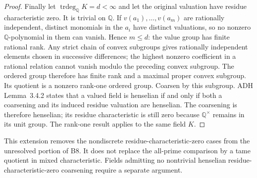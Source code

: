 \begin{proof}
Finally let $\operatorname{trdeg}_{\mathbb Q}K=d<\infty$
and let the original valuation have residue characteristic zero.
It is trivial on $\mathbb Q$. If
$v(a_1),\ldots,v(a_m)$ are rationally independent, distinct
monomials in the $a_i$ have distinct valuations, so no nonzero
$\mathbb Q$-polynomial in them can vanish. Hence $m\leq d$:
the value group has finite rational rank. Any strict chain of
convex subgroups gives rationally independent elements chosen
in successive differences; the highest nonzero coefficient in
a rational relation cannot vanish modulo the preceding convex
subgroup. The ordered group therefore has finite rank and a
maximal proper convex subgroup. Its quotient is a nonzero
rank-one ordered group. Coarsen by this subgroup.
ADH Lemma~3.4.2 states that a valued field is henselian if and
only if both a coarsening and its induced residue valuation are
henselian. The coarsening is therefore henselian; its residue
characteristic is still zero because $\mathbb Q^\times$
remains in its unit group. The rank-one result applies to the
same field $K$.\citep[Lemma~3.4.2]{ADH2017}
\end{proof}

This extension removes the nondiscrete residue-characteristic-zero
cases from the unresolved portion of B8. It does not replace the
all-prime comparison by a tame quotient in mixed characteristic.
Fields admitting no nontrivial henselian residue-characteristic-zero
coarsening require a separate argument.

